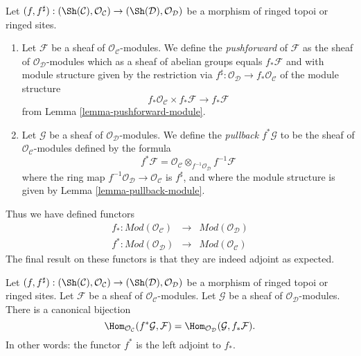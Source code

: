 \begin{definition}
\label{definition-pushforward}
Let
$(f, f^\sharp) :
(\Sh(\mathcal{C}), \mathcal{O}_\mathcal{C})
\to
(\Sh(\mathcal{D}), \mathcal{O}_\mathcal{D})$
be a morphism of ringed topoi or ringed sites.
\begin{enumerate}
\item Let $\mathcal{F}$ be a sheaf of $\mathcal{O}_\mathcal{C}$-modules.
We define the {\it pushforward} of $\mathcal{F}$ as the
sheaf of $\mathcal{O}_\mathcal{D}$-modules which as a sheaf
of abelian groups equals $f_*\mathcal{F}$ and with
module structure given by the restriction
via $f^\sharp : \mathcal{O}_\mathcal{D} \to f_*\mathcal{O}_\mathcal{C}$
of the module structure
$$
f_*\mathcal{O}_\mathcal{C} \times f_*\mathcal{F}
\longrightarrow
f_*\mathcal{F}
$$
from Lemma \ref{lemma-pushforward-module}.
\item Let $\mathcal{G}$ be a sheaf of $\mathcal{O}_\mathcal{D}$-modules.
We define the {\it pullback} $f^*\mathcal{G}$ to be the
sheaf of $\mathcal{O}_\mathcal{C}$-modules defined by the formula
$$
f^*\mathcal{F}
=
\mathcal{O}_\mathcal{C} \otimes_{f^{-1}\mathcal{O}_\mathcal{D}}
f^{-1}\mathcal{F}
$$
where the ring map
$f^{-1}\mathcal{O}_\mathcal{D} \to \mathcal{O}_\mathcal{C}$
is $f^\sharp$, and where the  module
structure is given by Lemma \ref{lemma-pullback-module}.
\end{enumerate}
\end{definition}

\noindent
Thus we have defined functors
\begin{eqnarray*}
f_* : \textit{Mod}(\mathcal{O}_\mathcal{C})
& \longrightarrow &
\textit{Mod}(\mathcal{O}_\mathcal{D}) \\
f^* : \textit{Mod}(\mathcal{O}_\mathcal{D})
& \longrightarrow &
\textit{Mod}(\mathcal{O}_\mathcal{C})
\end{eqnarray*}
The final result on these functors is that they are indeed
adjoint as expected.

\begin{lemma}
\label{lemma-adjoint-pullback-pushforward-modules}
Let
$(f, f^\sharp) :
(\Sh(\mathcal{C}), \mathcal{O}_\mathcal{C})
\to
(\Sh(\mathcal{D}), \mathcal{O}_\mathcal{D})$
be a morphism of ringed topoi or ringed sites.
Let $\mathcal{F}$ be a sheaf of $\mathcal{O}_\mathcal{C}$-modules.
Let $\mathcal{G}$ be a sheaf of $\mathcal{O}_\mathcal{D}$-modules.
There is a canonical bijection
$$
\Hom_{\mathcal{O}_\mathcal{C}}(f^*\mathcal{G}, \mathcal{F})
=
\Hom_{\mathcal{O}_\mathcal{D}}(\mathcal{G}, f_*\mathcal{F}).
$$
In other words: the functor $f^*$ is the left adjoint to
$f_*$.
\end{lemma}

